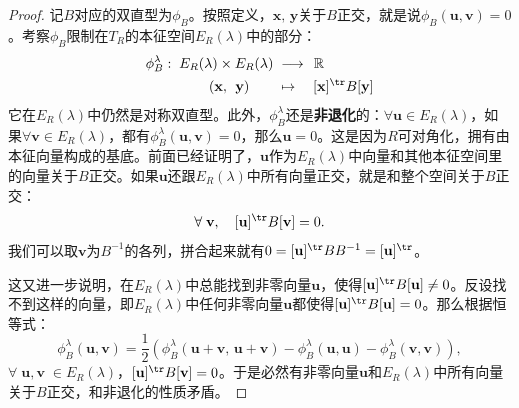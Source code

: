 \documentclass[12pt,UTF8]{ctexbook}
\begin{document}
\begin{appendix}
\begin{proof}
    记$B$对应的双直型为$\phi_B$。按照定义，$\mathbf{x},\, \mathbf{y}$关于$B$正交，就是说$\phi_B(\mathbf{u}, \mathbf{v}) = 0$。考察$\phi_B$限制在$T_R$的本征空间$E_R(\lambda)$中的部分：
    \begin{align*}
        \phi_B^{\lambda}: \; E_R(\lambda)\times E_R(\lambda)\; &\longrightarrow \;\, \mathbb{R} \\
        (\mathbf{x},\,\; \mathbf{y}) \quad\quad &\mapsto \quad [\mathbf{x}]^{\tr}B[\mathbf{y}]
    \end{align*}
    它在$E_R(\lambda)$中仍然是对称双直型。此外，$\phi_B^{\lambda}$还是\textbf{非退化}的：$\forall \mathbf{u}\in E_R(\lambda)$，如果$\forall \mathbf{v} \in E_R(\lambda)$，都有$\phi_B^{\lambda}(\mathbf{u}, \mathbf{v}) = 0$，那么$\mathbf{u} = 0$。这是因为$R$可对角化，拥有由本征向量构成的基底。前面已经证明了，$\mathbf{u}$作为$E_R(\lambda)$中向量和其他本征空间里的向量关于$B$正交。如果$\mathbf{u}$还跟$E_R(\lambda)$中所有向量正交，就是和整个空间关于$B$正交：
    $$ \forall \; \mathbf{v}, \quad [\mathbf{u}]^{\tr}B[\mathbf{v}] = 0. $$
    我们可以取$\mathbf{v}$为$B^{-1}$的各列，拼合起来就有$0 = [\mathbf{u}]^{\tr}BB^{-1} = [\mathbf{u}]^{\tr}$。

    这又进一步说明，在$E_R(\lambda)$中总能找到非零向量$\mathbf{u}$，使得$[\mathbf{u}]^{\tr}B[\mathbf{u}] \neq 0$。反设找不到这样的向量，即$E_R(\lambda)$中任何非零向量$\mathbf{u}$都使得$[\mathbf{u}]^{\tr}B[\mathbf{u}] = 0$。那么根据恒等式：
    $$
    \phi_B^{\lambda}(\mathbf{u}, \mathbf{v}) = \frac{1}{2}\left(\phi_B^{\lambda}(\mathbf{u}+\mathbf{v},\,\mathbf{u}+\mathbf{v}) - \phi_B^{\lambda}(\mathbf{u},\mathbf{u}) - \phi_B^{\lambda}(\mathbf{v},\mathbf{v})\right), 
    $$
    $\forall\;\mathbf{u}, \mathbf{v}\; \in E_R(\lambda)$，$[\mathbf{u}]^{\tr}B[\mathbf{v}] = 0$。于是必然有非零向量$\mathbf{u}$和$E_R(\lambda)$中所有向量关于$B$正交，和非退化的性质矛盾。


\end{proof}
\end{appendix}
\end{document}
